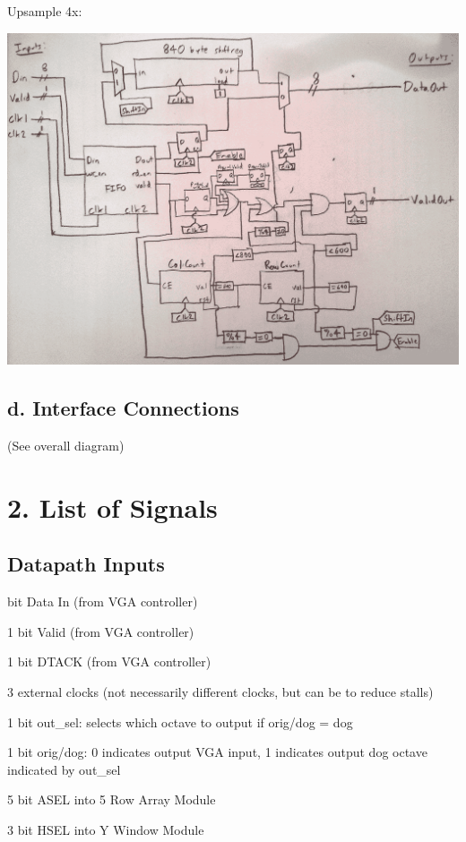 \documentclass[11pt]{article}
\begin{document}
\newpage

Upsample 4x:

\noindent\includegraphics[width=\textwidth]{modules/procupsample4x.png}

\subsection*{d. Interface Connections}

(See overall diagram)

\section*{2. List of Signals}

\subsection*{Datapath Inputs}

 bit Data In (from VGA controller)

1 bit Valid  (from VGA controller)

1 bit DTACK (from VGA controller)

3 external clocks (not necessarily different clocks, but can be to reduce stalls)

1 bit out\_sel: selects which octave to output if orig/dog = dog

1 bit orig/dog: 0 indicates output VGA input, 1 indicates output dog octave indicated by out\_sel

5 bit ASEL into 5 Row Array Module

3 bit HSEL into Y Window Module
\end{document}
